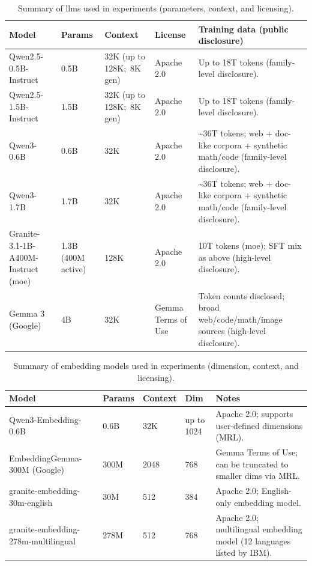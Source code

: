 
\begin{table}
  \centering
  \scriptsize
  \caption{Summary of \glspl{llm} used in experiments (parameters,
  context, and licensing).}\label{tab:llm-summary}
    \begin{tabularx}{\textwidth}{XXXXX}
    \toprule
    \textbf{Model} & \textbf{Params} & \textbf{Context} &
    \textbf{License} & \textbf{Training data (public disclosure)} \\
    \midrule
    Qwen2.5-0.5B-Instruct & 0.5B & 32K \newline (up to 128K;\ 8K gen) & Apache 2.0 &
    Up to 18T tokens (family-level disclosure). \\
    Qwen2.5-1.5B-Instruct & 1.5B & 32K \newline (up to 128K;\ 8K gen) & Apache 2.0 &
    Up to 18T tokens (family-level disclosure). \\
    Qwen3-0.6B & 0.6B & 32K & Apache 2.0 &
    \textasciitilde{}36T tokens; web + doc-like corpora + synthetic
    math/code (family-level disclosure). \\
    Qwen3-1.7B & 1.7B & 32K & Apache 2.0 &
    \textasciitilde{}36T tokens; web + doc-like corpora + synthetic
    math/code (family-level disclosure). \\
    Granite-3.1-1B-A400M-Instruct (\gls{moe}) & 1.3B \newline (400M active) & 128K &
    Apache 2.0 & 10T tokens (\gls{moe}); SFT mix as above (high-level disclosure). \\
    Gemma 3 (Google) & 4B & 32K & Gemma Terms of Use &
    Token counts disclosed; broad web/code/math/image sources
    (high-level disclosure). \\
    \bottomrule
  \end{tabularx}
\end{table}

\begin{table}
  \centering
  \scriptsize
  \caption{Summary of embedding models used in experiments
  (dimension, context, and licensing).}\label{tab:embedding-summary}
  \begin{tabularx}{\textwidth}{XlllX}
    \toprule
    \textbf{Model} & \textbf{Params} & \textbf{Context} &
    \textbf{Dim} & \textbf{Notes} \\
    \midrule
    Qwen3-Embedding-0.6B & 0.6B & 32K & up to 1024 & Apache 2.0;
    supports user-defined dimensions (MRL). \\
    EmbeddingGemma-300M (Google) & 300M & 2048 & 768 & Gemma Terms of
    Use; can be truncated to smaller dims via MRL. \\
    granite-embedding-30m-english & 30M & 512 & 384 & Apache 2.0;
    English-only embedding model. \\
    granite-embedding-278m-multilingual & 278M & 512 & 768 & Apache
    2.0; multilingual embedding model (12 languages listed by IBM). \\
    \bottomrule
  \end{tabularx}
\end{table}
